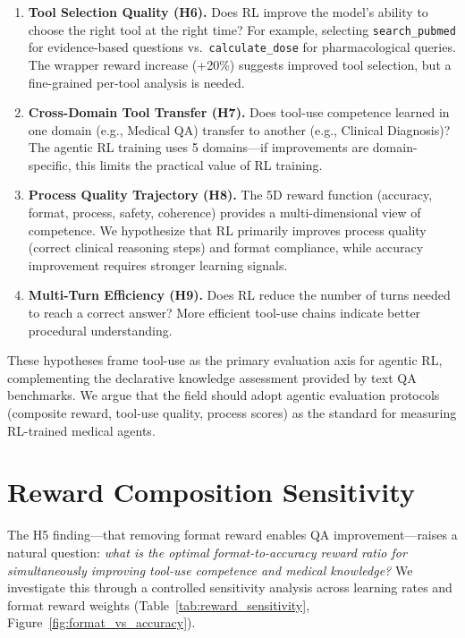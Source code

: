 \documentclass{article}
\begin{document}
\begin{enumerate}
    \item \textbf{Tool Selection Quality (H6).} Does RL improve the model's ability to choose the right tool at the right time? For example, selecting \texttt{search\_pubmed} for evidence-based questions vs.\ \texttt{calculate\_dose} for pharmacological queries. The wrapper reward increase (+20\%) suggests improved tool selection, but a fine-grained per-tool analysis is needed.

    \item \textbf{Cross-Domain Tool Transfer (H7).} Does tool-use competence learned in one domain (e.g., Medical QA) transfer to another (e.g., Clinical Diagnosis)? The agentic RL training uses 5 domains---if improvements are domain-specific, this limits the practical value of RL training.

    \item \textbf{Process Quality Trajectory (H8).} The 5D reward function (accuracy, format, process, safety, coherence) provides a multi-dimensional view of competence. We hypothesize that RL primarily improves process quality (correct clinical reasoning steps) and format compliance, while accuracy improvement requires stronger learning signals.

    \item \textbf{Multi-Turn Efficiency (H9).} Does RL reduce the number of turns needed to reach a correct answer? More efficient tool-use chains indicate better procedural understanding.
\end{enumerate}

These hypotheses frame tool-use as the primary evaluation axis for agentic RL, complementing the declarative knowledge assessment provided by text QA benchmarks. We argue that the field should adopt agentic evaluation protocols (composite reward, tool-use quality, process scores) as the standard for measuring RL-trained medical agents.


\section{Reward Composition Sensitivity}
\label{app:reward_sensitivity}

The H5 finding---that removing format reward enables QA improvement---raises a natural question: \emph{what is the optimal format-to-accuracy reward ratio for simultaneously improving tool-use competence and medical knowledge?} We investigate this through a controlled sensitivity analysis across learning rates and format reward weights (Table~\ref{tab:reward_sensitivity}, Figure~\ref{fig:format_vs_accuracy}).
\end{document}
